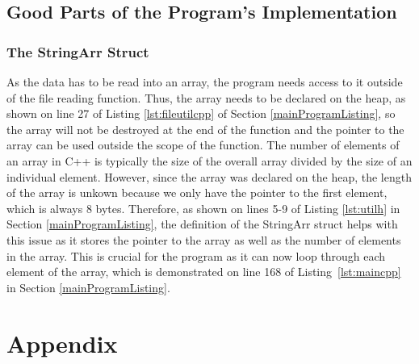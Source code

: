 \documentclass[letterpaper, 10pt,DIV=13]{scrartcl}
\numberwithin{equation}{section} %
\numberwithin{figure}{section} %
\numberwithin{table}{section} %
\begin{document}
\subsection{Good Parts of the Program's Implementation}
\subsubsection{The StringArr Struct}
As the data has to be read into an array, the program needs access to it outside of the file reading function. Thus, the array needs to be declared on the heap, as shown on line 27 of Listing \ref{lst:fileutilcpp} of Section \ref{mainProgramListing}, so the array will not be destroyed at the end of the function and the pointer to the array can be used outside the scope of the function. The number of elements of an array in C++ is typically the size of the overall array divided by the size of an individual element. However, since the array was declared on the heap, the length of the array is unkown because we only have the pointer to the first element, which is always 8 bytes. Therefore, as shown on lines 5-9 of Listing \ref{lst:utilh} in Section \ref{mainProgramListing}, the definition of the StringArr struct helps with this issue as it stores the pointer to the array as well as the number of elements in the array. This is crucial for the program as it can now loop through each element of the array, which is demonstrated on line 168 of Listing~\ref{lst:maincpp} in Section \ref{mainProgramListing}.

\section{Appendix}
\lstset{numbers=left, numberstyle=\tiny, stepnumber=1, numbersep=5pt}

\end{document}
